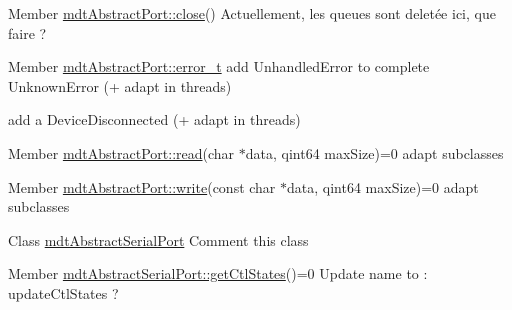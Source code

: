 \label{todo__todo000013}
\hypertarget{todo__todo000013}{}
 
\begin{DoxyDescription}
\item[Member \hyperlink{classmdt_abstract_port_a1ace1a2bd1a04f16952980e247b04800}{mdtAbstractPort::close}() ]Actuellement, les queues sont deletée ici, que faire ? 
\end{DoxyDescription}

\label{todo__todo000012}
\hypertarget{todo__todo000012}{}
 
\begin{DoxyDescription}
\item[Member \hyperlink{classmdt_abstract_port_ad4121bb930c95887e77f8bafa065a85e}{mdtAbstractPort::error\_\-t} ]add UnhandledError to complete UnknownError (+ adapt in threads) 

add a DeviceDisconnected (+ adapt in threads) 
\end{DoxyDescription}

\label{todo__todo000014}
\hypertarget{todo__todo000014}{}
 
\begin{DoxyDescription}
\item[Member \hyperlink{classmdt_abstract_port_a9d9c45220d5328c9856a2445557fe970}{mdtAbstractPort::read}(char $\ast$data, qint64 maxSize)=0 ]adapt subclasses 
\end{DoxyDescription}

\label{todo__todo000015}
\hypertarget{todo__todo000015}{}
 
\begin{DoxyDescription}
\item[Member \hyperlink{classmdt_abstract_port_a64d4802975a76474b9196c91f57a6d90}{mdtAbstractPort::write}(const char $\ast$data, qint64 maxSize)=0 ]adapt subclasses 
\end{DoxyDescription}

\label{todo__todo000048}
\hypertarget{todo__todo000048}{}
 
\begin{DoxyDescription}
\item[Class \hyperlink{classmdt_abstract_serial_port}{mdtAbstractSerialPort} ]Comment this class 
\end{DoxyDescription}

\label{todo__todo000049}
\hypertarget{todo__todo000049}{}
 
\begin{DoxyDescription}
\item[Member \hyperlink{classmdt_abstract_serial_port_aaeacd26b220ab0f8c521cef74edfafdd}{mdtAbstractSerialPort::getCtlStates}()=0 ]Update name to : updateCtlStates ? 
\end{DoxyDescription}


